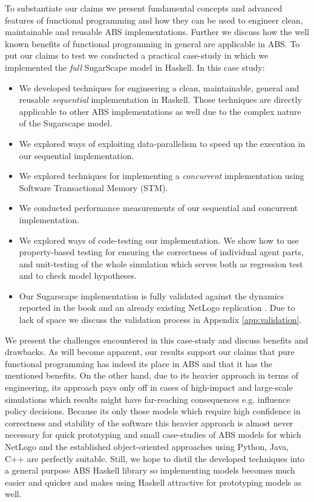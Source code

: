 To substantiate our claims we present fundamental concepts and advanced features of functional programming and how they can be used to engineer clean, maintainable and reusable ABS implementations. Further we discuss how the well known benefits of functional programming in general are applicable in ABS. To put our claims to test we conducted a practical case-study in which we implemented the \textit{full} SugarScape model \cite{epstein_growing_1996} in Haskell. In this case study:
\begin{itemize}
	\item We developed techniques for engineering a clean, maintainable, general and reusable \textit{sequential} implementation in Haskell. Those techniques are directly applicable to other ABS implementations as well due to the complex nature of the Sugarscape model.
	
	\item We explored ways of exploiting data-parallelism to speed up the execution in our sequential implementation.
	
	\item We explored techniques for implementing a \textit{concurrent} implementation using Software Transactional Memory (STM).
	
	\item We conducted performance measurements of our sequential and concurrent implementation.
	
	\item We explored ways of code-testing our implementation. We show how to use property-based testing for ensuring the correctness of individual agent parts, and unit-testing of the whole simulation which serves both as regression test and to check model hypotheses.
	
	\item Our Sugarscape implementation is fully validated against the dynamics reported in the book \cite{epstein_growing_1996} and an already existing NetLogo replication \cite{weaver_replicating_nodate}. Due to lack of space we discuss the validation process in Appendix \ref{app:validation}.
\end{itemize}

We present the challenges encountered in this case-study and discuss benefits and drawbacks. As will become apparent, our results support our claims that pure functional programming has indeed its place in ABS and that it has the mentioned benefits. On the other hand, due to its heavier approach in terms of engineering, its approach pays only off in cases of high-impact and large-scale simulations which results might have far-reaching consequences e.g. influence policy decisions. Because its only those models which require high confidence in correctness and stability of the software this heavier approach is almost never necessary for quick prototyping and small case-studies of ABS models for which NetLogo and the established object-oriented approaches using Python, Java, C++ are perfectly suitable. Still, we hope to distil the developed techniques into a general purpose ABS Haskell library so implementing models becomes much easier and quicker and makes using Haskell attractive for prototyping models as well.
 
